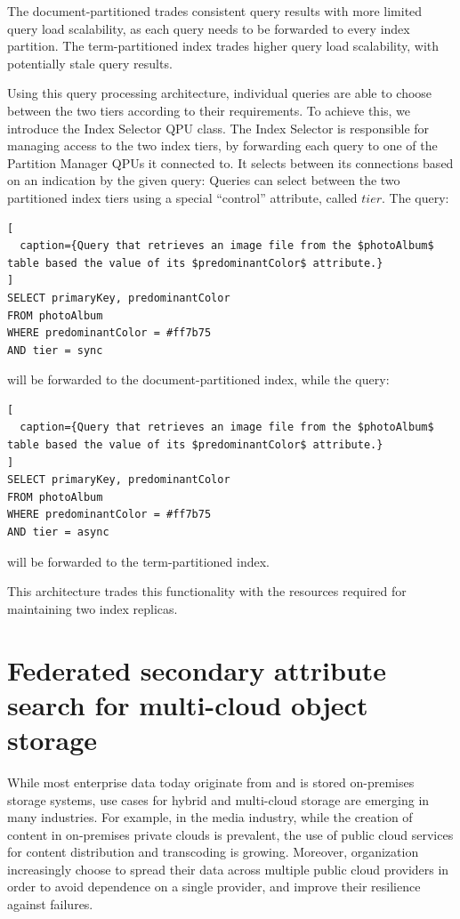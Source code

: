 The document-partitioned trades consistent query results with more limited query load scalability,
as each query needs to be forwarded to every index partition.
The term-partitioned index trades higher query load scalability, with potentially stale query results.

Using this query processing architecture, individual queries are able to choose between the two tiers
according to their requirements.
To achieve this, we introduce the Index Selector QPU class.
The Index Selector is responsible for managing access to the two index tiers,
by forwarding each query to one of the Partition Manager QPUs it connected to.
It selects between its connections based on an indication by the given query:
Queries can select between the two partitioned index tiers using a special ``control'' attribute, called $tier$.
The query:

\begin{lstlisting}[
  caption={Query that retrieves an image file from the $photoAlbum$ table based the value of its $predominantColor$ attribute.}
]
SELECT primaryKey, predominantColor
FROM photoAlbum
WHERE predominantColor = #ff7b75
AND tier = sync
\end{lstlisting}

\noindent
will be forwarded to the document-partitioned index, while the query:

\begin{lstlisting}[
  caption={Query that retrieves an image file from the $photoAlbum$ table based the value of its $predominantColor$ attribute.}
]
SELECT primaryKey, predominantColor
FROM photoAlbum
WHERE predominantColor = #ff7b75
AND tier = async
\end{lstlisting}

will be forwarded to the term-partitioned index.

This architecture trades this functionality with the resources required for maintaining
two index replicas.



\section{Federated secondary attribute search for multi-cloud object storage}
\label{sec:zenko}

While most enterprise data today originate from and is stored on-premises storage systems,
use cases for hybrid and multi-cloud storage are emerging in many industries.
For example, in the media industry, while the creation of content in on-premises private clouds is prevalent,
the use of public cloud services for content distribution and transcoding \cite{scality:bloomberg} is growing.
Moreover, organization increasingly choose to spread their data across multiple public cloud providers in order to avoid
dependence on a single provider, and improve their resilience against failures.

